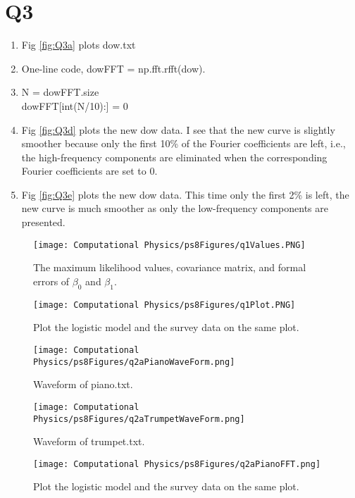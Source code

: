 \documentclass[11pt]{article}
\begin{document}
\section*{Q3}
\begin{enumerate}[label=\alph*)]
    \item Fig \ref{fig:Q3a} plots dow.txt
    \item One-line code, dowFFT = np.fft.rfft(dow).
    \item N = dowFFT.size\\dowFFT[int(N/10):] = 0
    \item Fig \ref{fig:Q3d} plots the new dow data. I see that the new curve is slightly smoother because only the first 10\% of the Fourier coefficients are left, i.e., the high-frequency components are eliminated when the corresponding Fourier coefficients are set to 0.
    \item Fig \ref{fig:Q3e} plots the new dow data. This time only the first 2\% is left, the new curve is much smoother as only the low-frequency components are presented.
\end{enumerate}

\begin{figure}[b!]
\centering
\texttt{[image: Computational Physics/ps8Figures/q1Values.PNG]}
\caption{The maximum likelihood values, covariance matrix, and formal errors of $\beta_0$ and $\beta_1$.}
  \label{fig:Q1Values}
\end{figure}

\begin{figure}[b!]
\centering
\texttt{[image: Computational Physics/ps8Figures/q1Plot.PNG]}
\caption{Plot the logistic model and the survey data on the same plot.}
  \label{fig:Q1Plot}
\end{figure}

\begin{figure}[b!]
\centering
\texttt{[image: Computational Physics/ps8Figures/q2aPianoWaveForm.png]}
\caption{Waveform of piano.txt.}
  \label{fig:Q2PianoWave}
\end{figure}

\begin{figure}[b!]
\centering
\texttt{[image: Computational Physics/ps8Figures/q2aTrumpetWaveForm.png]}
\caption{Waveform of trumpet.txt.}
  \label{fig:Q2TrumpetWave}
\end{figure}

\begin{figure}[b!]
\centering
\texttt{[image: Computational Physics/ps8Figures/q2aPianoFFT.png]}
\caption{Plot the logistic model and the survey data on the same plot.}
  \label{fig:Q2PianoFFT}
\end{figure}
\end{document}

